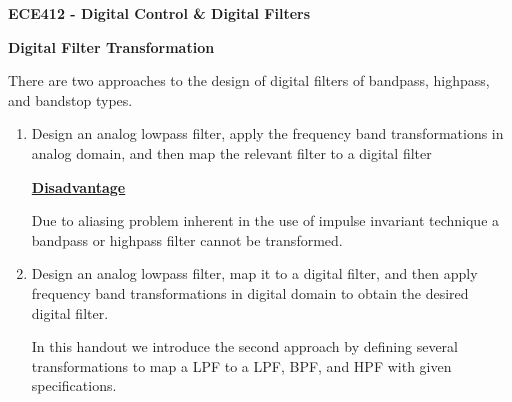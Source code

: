 \documentclass [12pt]{article}   %
\begin{document}
\begin{center}
{\bf \Large ECE412 - Digital Control \& Digital Filters}

\smallskip
{\bf \large Digital Filter Transformation}

\end{center}

\renewcommand{\baselinestretch}{1}\small\normalsize
\medskip
There are two approaches to the design of digital filters of bandpass, highpass, and bandstop types.
\begin{enumerate}
	\item Design an analog lowpass filter, apply the frequency band transformations in analog domain, and then map the relevant filter to a digital filter 
	
	\medskip
	{\bf \underline{Disadvantage}} 
	
	\medskip
	Due to aliasing problem inherent in the use of impulse invariant technique a bandpass or highpass filter cannot be transformed.
	\item Design an analog lowpass filter, map it to a digital filter, and then apply frequency band transformations in digital domain to obtain the desired digital filter.
	
	\smallskip
	In this handout we introduce the second approach by defining several transformations to map a LPF to a LPF, BPF, and HPF with given specifications.
\end{enumerate}
\end{document}
